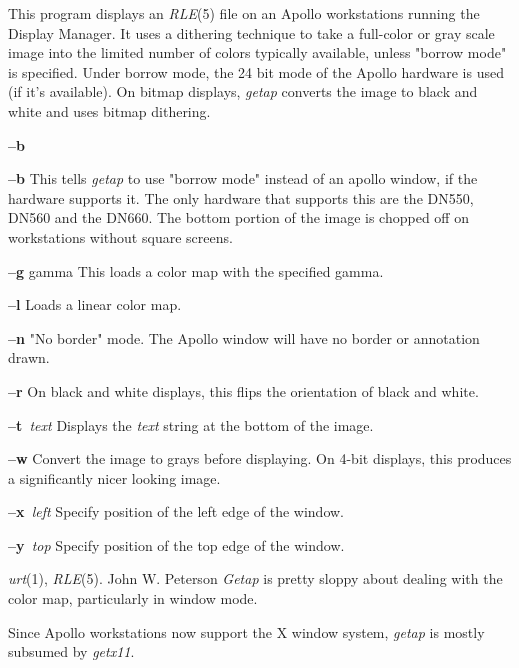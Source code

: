 This program displays an
{\it RLE}{\rm (5)}
file on an Apollo workstations running the Display Manager.
It uses a dithering technique to take a
full-color or gray scale image into the limited number of colors
typically available, unless "borrow mode" is specified.  Under
borrow mode, the 24 bit mode of the Apollo hardware is used (if it's
available).  On bitmap displays, 
{\it getap}
converts the image to black and white and uses bitmap dithering.
\begin{TPlist}{{\bf --b}}
\item[{{\bf --b}}]
This tells
{\it getap}
to use "borrow mode" instead of an apollo window, if the hardware supports
it.  The only hardware that supports this are the DN550, DN560 and the
DN660.  The bottom portion of the image is chopped off on workstations without
square screens.
\item[{{\bf --g} gamma}]
This loads a color map with the specified gamma.
\item[{{\bf --l}}]
Loads a linear color map.
\item[{{\bf --n}}]
"No border" mode.  The Apollo window will have no border or annotation drawn.
\item[{{\bf --r}}]
On black and white displays, this flips the orientation of black and white.
\item[{{\bf --t}{\it \ text}
}]
Displays the 
{\it text}
string at the bottom of the image.
\item[{{\bf --w}}]
Convert the image to grays before displaying.  On 4-bit displays, this
produces a significantly nicer looking image.
\item[{{\bf --x}{\it \ left}
}]
Specify position of the left edge of the window.
\item[{{\bf --y}{\it \ top}
}]
Specify position of the top edge of the window.
\end{TPlist}
{\it urt}{\rm (1),}
{\it RLE}{\rm (5).}
John W. Peterson
{\it Getap}
is pretty sloppy about dealing with the color map, particularly in window
mode.

Since Apollo workstations now support the X window system, 
{\it getap}
is mostly subsumed by 
{\it getx11}{\rm .}

\newpage


